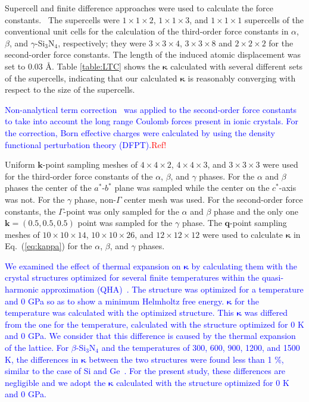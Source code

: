 \documentclass[twocolumn,amsmath,amssymb,a4paper,prb,superscriptaddress,floatfix]{revtex4-1}
\begin{document}
Supercell and finite difference approaches were used to calculate the
force constants.~\cite{wei-supercell} The supercells were $1\times 1\times2$, $1\times
1\times3$, and $1\times 1\times1$ supercells of the conventional unit cells for
the calculation of the third-order force constants in $\alpha$, $\beta$, and
$\gamma$-Si$_3$N$_4$, respectively; they were $3\times 3\times4$, $3\times
3\times8$ and $2\times 2\times2$ for the second-order force constants.  The length of the
induced atomic displacement was set to 0.03 \AA.  Table \ref{table:LTC} shows
the $\boldsymbol{\kappa}$  calculated with several different sets of the supercells,
indicating that our calculated $\boldsymbol{\kappa}$ is reasonably converging with respect to
the size of the supercells. 

\textcolor{blue}{Non-analytical term correction~\cite{wang} was applied to the
second-order force  constants to take into account the long range Coulomb forces present in
ionic crystals. For the correction, Born effective charges were calculated by
using the density functional perturbation theory (DFPT).}\textcolor{red}{Ref!}

Uniform $\mathbf{k}$-point sampling meshes of $4\times 4\times 2$,
$4\times 4\times 3$, and $3\times 3\times 3$ were used for the
third-order force constants of the $\alpha$, $\beta$, and $\gamma$ phases. For the
$\alpha$ and $\beta$ phases the center of the $a^*$-$b^*$ plane was sampled
while the center on the $c^*$-axis was not. For the
$\gamma$ phase, non-$\Gamma$ center mesh was used. For the second-order
force constants, the $\Gamma$-point was only sampled for the $\alpha$ and $\beta$
phase and the only one $\mathbf{k}=(0.5, 0.5, 0.5)$ point was
sampled for the $\gamma$ phase. The $\mathbf{q}$-point
sampling meshes of $10\times 10\times 14$, $10\times 10\times 26$, and
$12\times 12\times 12$ were used to calculate $\boldsymbol{\kappa}$ in Eq.~(\ref{eq:kappa})
for the $\alpha$, $\beta$, and $\gamma$ phases.

\textcolor {blue}{We examined the effect of thermal expansion on
$\boldsymbol{\kappa}$ by calculating them with the crystal structures
optimized for several finite temperatures within the quasi-harmonic
approximation (QHA)~\cite{dove-p76}.  The structure was optimized for a
temperature and 0 GPa so as to show a minimum Helmholtz free energy.
$\boldsymbol{\kappa}$ for the temperature was calculated with the optimized
structure.  This $\boldsymbol{\kappa}$ was differed from the one for the
temperature, calculated with the structure optimized for 0 K and 0 GPa. We
consider that this difference is caused by the thermal expansion of the
lattice. For $\beta$-Si$_3$N$_4$ and the temperatures of 300, 600, 900,
1200, and 1500 K, the differences in $\boldsymbol{\kappa}$ between the two
structures were found less than 1 \%, similar to the case of Si and
Ge~\cite{ward-ltc}. For the present study, these differences are negligible
and we adopt the $\boldsymbol{\kappa}$ calculated with the structure
optimized for 0 K and 0 GPa.}
\end{document}
